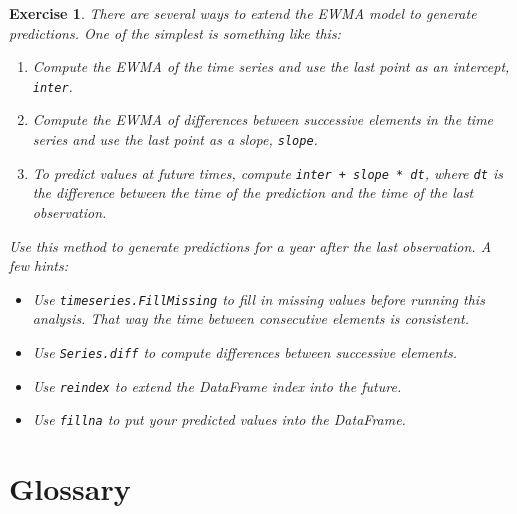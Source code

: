 \documentclass[12pt]{book}
\theoremstyle{exercise}
\newtheorem{exercise}{Exercise}[chapter]
\begin{document}
\begin{exercise}
There are several ways to extend the EWMA model to generate predictions.
One of the simplest is something like this:%

\begin{enumerate}

\item Compute the EWMA of the time series and use the last point
as an intercept, {\tt inter}.

\item Compute the EWMA of differences between successive elements in
the time series and use the last point as a slope, {\tt slope}.%

\item To predict values at future times, compute {\tt inter + slope * dt},
where {\tt dt} is the difference between the time of the prediction and
the time of the last observation.%

\end{enumerate}

Use this method to generate predictions for a year after the last
observation.  A few hints:

\begin{itemize}

\item Use {\tt timeseries.FillMissing} to fill in missing values
before running this analysis.  That way the time between consecutive
elements is consistent.%

\item Use {\tt Series.diff} to compute differences between successive
elements.%

\item Use {\tt reindex} to extend the DataFrame index into the future.%

\item Use {\tt fillna} to put your predicted values into the DataFrame.%

\end{itemize}

\end{exercise}


\section{Glossary}
\end{document}
